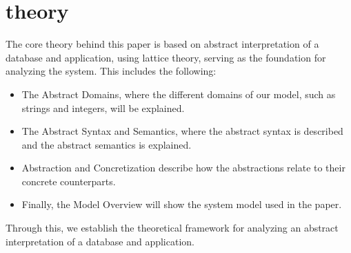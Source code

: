 \section{theory}\label{theory}
The core theory behind this paper is based on abstract interpretation of a database and application, using lattice theory, serving as the foundation for analyzing the system.
This includes the following:

\begin{itemize}
    \item The Abstract Domains, where the different domains of our model, such as strings and integers, will be explained.
    \item The Abstract Syntax and Semantics, where the abstract syntax is described and the abstract semantics is explained.
    \item Abstraction and Concretization describe how the abstractions relate to their concrete counterparts.
    \item Finally, the Model Overview will show the system model used in the paper.
\end{itemize}

Through this, we establish the theoretical framework for analyzing an abstract interpretation of a database and application.




